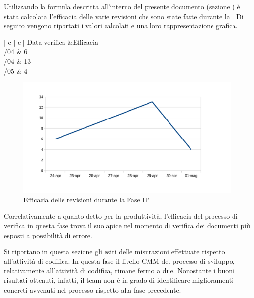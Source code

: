 	Utilizzando la formula descritta all'interno del presente documento (sezione ) è stata calcolata l'efficacia delle varie revisioni che sono state fatte durante la . Di seguito vengono riportati i valori calcolati e una loro rappresentazione grafica.
	\begin{table}[H]
		\centering
		\begin{tabu}{| c | c |}
		\hline
		Data verifica &Efficacia\\ \hline {}/04 & 6 \\ /04 & 13\\ /05 & 4 \\ \hline		
		\end{tabu}
		\caption{Efficacia delle revisioni durante la fase IP}
	\end{table}
	\begin{figure}[H]
		\centering
		\includegraphics[width=12cm]{PianoDiQualifica/Pics/EfficaciaRevisioniFaseIP.pdf}
		\caption{Efficacia delle revisioni durante la Fase IP}
	\end{figure}

	Correlativamente a quanto detto per la produttività, l'efficacia del processo di verifica in questa fase trova il suo apice nel momento di verifica dei documenti più esposti a possibilità di errore.
	
		Si riportano in questa sezione gli esiti delle misurazioni effettuate rispetto all'attività di codifica.
		In questa fase il livello CMM del processo di sviluppo, relativamente all'attività di codifica, rimane fermo a due. Nonostante i buoni risultati ottenuti, infatti, il team non è in grado di identificare miglioramenti concreti avvenuti nel processo rispetto alla fase precedente.
		
